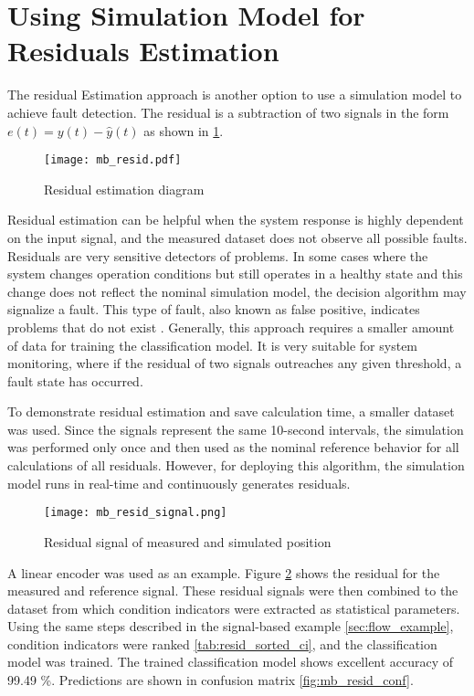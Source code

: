 \section{Using Simulation Model for Residuals Estimation}\label{sec:residuals}
The residual Estimation approach is another option to use a simulation
model to achieve fault detection.  The residual is a subtraction of two
signals in the form $e(t) = y(t) - \hat{y}(t)$ as shown in
\ref{fig:mb_resid_workflow}.

\begin{figure}[h!]
    \centering
    \texttt{[image: mb\_resid.pdf]}
    \caption{Residual estimation diagram}
    \label{fig:mb_resid_workflow}
\end{figure}

Residual estimation can be helpful when the system response is highly
dependent on the input signal, and the measured dataset does not observe
all possible faults. Residuals are very sensitive detectors of problems. In
some cases where the system changes operation conditions but still operates
in a healthy state and this change does not reflect the nominal simulation
model, the decision algorithm may signalize a fault. This type of fault,
also known as false positive, indicates problems that do not exist \cite{}.
Generally, this approach requires a smaller amount of data for training the
classification model. It is very suitable for system monitoring, where if
the residual of two signals outreaches any given threshold, a fault state
has occurred. 



To demonstrate residual estimation and save calculation time, a smaller
dataset was used. Since the signals represent the same 10-second intervals,
the simulation was performed only once and then used as the nominal
reference behavior for all calculations of all residuals. However, for
deploying this algorithm, the simulation model runs in real-time and
continuously generates residuals.

\begin{figure}[h!]
    \centering
    \texttt{[image: mb\_resid\_signal.png]}
    \caption{Residual signal of measured and simulated position}
    \label{fig:mb_resid_signal}
\end{figure}

A linear encoder was used as an example. Figure \ref{fig:mb_resid_signal} shows the residual
for the measured and reference signal. These residual signals were then
combined to the dataset from which condition indicators were extracted as
statistical parameters.  Using the same steps described in the signal-based
example \ref{sec:flow_example}, condition indicators were ranked
\ref{tab:resid_sorted_ci}, and the
classification model was trained. The trained classification model shows
excellent accuracy of 99.49 \%. Predictions are shown in confusion matrix
\ref{fig:mb_resid_conf}.

